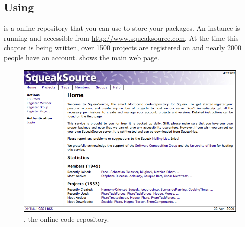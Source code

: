 \documentclass[a4paper,10pt,twoside]{book}
\begin{document}





\subsection{Using \sqsrc}

\indmain{\sqsrc} is a online repository that you can use to store your \MC packages. An instance is running and accessible from \url{http://www.squeaksource.com}. At the time this chapter is being written, over 1500 projects are registered on \sqsrc and nearly 2000 people have an account.  shows the main web page.  

\begin{figure}[ht]\centering
	\includegraphics[width=\textwidth]{squeaksource2}
	\caption{\sqsrc, the online \MC code repository.}
\end{figure}
\end{document}
